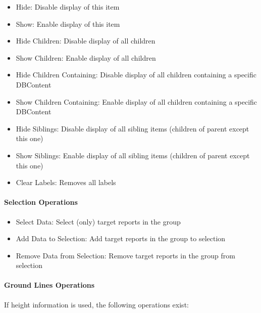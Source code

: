 \begin{itemize}
 \item Hide: Disable display of this item
 \item Show: Enable display of this item
 \item Hide Children: Disable display of all children
 \item Show Children: Enable display of all children
 \item Hide Children Containing: Disable display of all children containing a specific DBContent
 \item Show Children Containing: Enable display of all children containing a specific DBContent
 \item Hide Siblings: Disable display of all sibling items (children of parent except this one)
 \item Show Siblings: Enable display of all sibling items (children of parent except this one)
 \item Clear Labels: Removes all labels
\end{itemize}

\paragraph{Selection Operations}

\begin{itemize}
 \item Select Data: Select (only) target reports in the group
 \item Add Data to Selection: Add target reports in the group to selection
 \item Remove Data from Selection: Remove target reports in the group from selection
\end{itemize}

% 


\paragraph{Ground Lines Operations}
If height information is used, the following operations exist:

